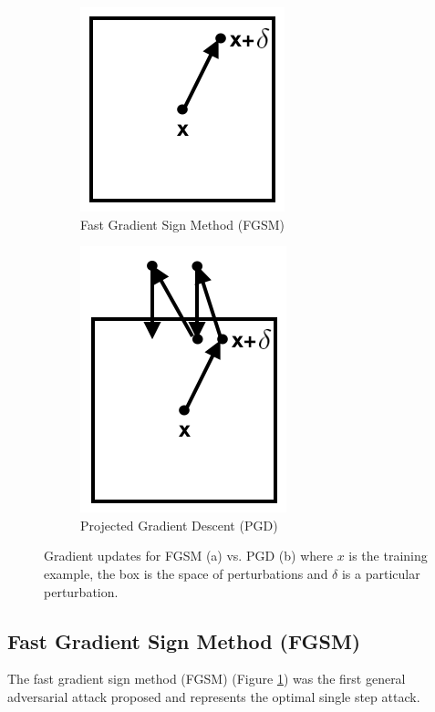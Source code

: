 \documentclass[10pt]{article}
\begin{document}
\begin{figure}[!h]
\centering
\begin{subfigure}[t]{0.45\textwidth}
\centerline{\includegraphics[width=0.5\linewidth]{fgsm.png}}
\caption{Fast Gradient Sign Method (FGSM)}
\label{fig:fgsm}
\end{subfigure}
\centering
\begin{subfigure}[t]{0.45\textwidth}
\centerline{\includegraphics[width=0.5\linewidth]{pgd.png}}
\caption{Projected Gradient Descent (PGD)}
\label{fig:pgd}
\end{subfigure}
\caption{Gradient updates for FGSM (a) vs. PGD (b) where $x$ is the training example, the box is the space of perturbations and $\delta$ is a particular perturbation.}
\end{figure}


\subsection{Fast Gradient Sign Method (FGSM)}

The fast gradient sign method (FGSM) (Figure \ref{fig:fgsm}) was the first general adversarial attack proposed and represents the optimal single step attack. 
\end{document}
